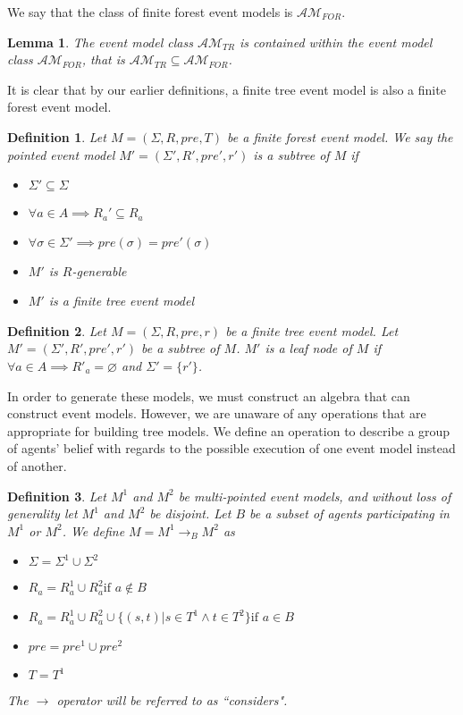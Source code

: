 \documentclass[12pt, a4paper, titlepage]{article}
\newtheorem{defn}{Definition}[subsection]
\newtheorem{lemma}{Lemma}[subsection]
\numberwithin{equation}{section}
\newcommand{\eventClass}{\mathcal{AM}}
\newcommand{\treeClass}{\eventClass_{TR}}
\newcommand{\forestClass}{\eventClass_{FOR}}
\begin{document}
We say that the class of finite forest event models is $\forestClass$.

\begin{lemma} \label{treeIsForest}
The event model class $\treeClass$ is contained within the event model class
$\forestClass$, that is $\treeClass \subseteq \forestClass$.
\end{lemma}

It is clear that by our earlier definitions, a finite tree event model is also a finite forest event
model.

\begin{defn} \label{subtree}
Let $M = (\Sigma, R, pre, T)$ be a finite forest event model.
We say the pointed event model $M' = (\Sigma', R', pre', r')$ is a subtree of $M$ if
\begin{itemize}
	\item $\Sigma' \subseteq \Sigma$
	\item $\forall a \in A \implies R_a' \subseteq R_a$
	\item $\forall \sigma \in \Sigma' \implies pre(\sigma) = pre'(\sigma) $
	\item $M'$ is $R$-generable
	\item $M'$ is a finite tree event model
\end{itemize}
\end{defn}

\begin{defn} \label{leaf}
Let $M = (\Sigma, R, pre, r)$ be a finite tree event model.
Let $M' = (\Sigma', R', pre', r')$ be a subtree of $M$.
$M'$ is a leaf node of $M$ if $\forall a \in A \implies R'_a = \varnothing$ and $\Sigma' = \{ r'\}$.
\end{defn}

In order to generate these models, we must construct an algebra that can construct event models.
However, we are unaware of any operations that are appropriate for building tree models.
We define an operation to describe a group of agents' belief with regards to the possible execution
of one event model instead of another.

\begin{defn} \label{considers}
Let $M^1$ and $M^2$ be multi-pointed event models, and without loss of
generality let $M^1$ and $M^2$ be disjoint.
Let $B$ be a subset of agents participating in $M^1$ or $M^2$.
We define $M = M^1 \to_B M^2$ as 
\begin{itemize}
  \item $\Sigma = \Sigma^1 \cup \Sigma^2$
  \item $R_a = R^1_a \cup R^2_a \text{if } a \notin B$
	\item $R_a =
      R^1_a \cup
      R^2_a \cup
      \{(s,t) | s \in T^1 \land t \in T^2 \}
    \text{if } a \in B $
  \item $pre = pre^1 \cup pre^2$
  \item $T = T^1$
\end{itemize}
The $\to$ operator will be referred to as ``considers".
\end{defn}
\end{document}
